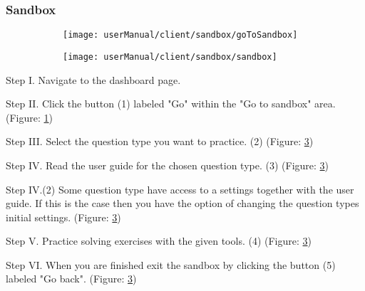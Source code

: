 \subsubsection{Sandbox}
\begin{figure}[H]
	\begin{subfigure}{0.70\linewidth}
		\texttt{[image: userManual/client/sandbox/goToSandbox]}
		\caption{}
		\label{fig:goToSanbox}
	\end{subfigure}
	\begin{subfigure}{0.80\linewidth}
		\texttt{[image: userManual/client/sandbox/sandbox]}
		\caption{}		
		\label{fig:sandbox}
	\end{subfigure}
\end{figure}

\begin{userManualItemlist}
	\item[Step I.] Navigate to the dashboard page.
	\item[Step II.] Click the button (1) labeled "Go" within the "Go to sandbox" area. (Figure: \ref{fig:goToSanbox})
	\item[Step III.] Select the question type you want to practice. (2) (Figure: \ref{fig:sandbox})
	\item[Step IV.] Read the user guide for the chosen question type. (3) (Figure: \ref{fig:sandbox})
	\item[Step IV.(2)] Some question type have access to a settings together with the user guide. If this is the case then you have the option of changing the question types initial settings. (Figure: \ref{fig:sandbox})
	\item[Step V.] Practice solving exercises with the given tools. (4) (Figure: \ref{fig:sandbox})
	\item[Step VI.] When you are finished exit the sandbox by clicking the button (5) labeled "Go back". (Figure: \ref{fig:sandbox})
\end{userManualItemlist}